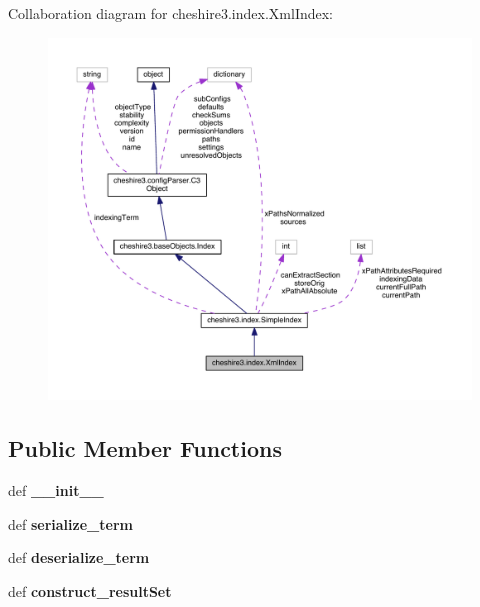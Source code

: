 Collaboration diagram for cheshire3.\-index.\-Xml\-Index\-:
\nopagebreak
\begin{figure}[H]
\begin{center}
\leavevmode
\includegraphics[width=350pt]{classcheshire3_1_1index_1_1_xml_index__coll__graph}
\end{center}
\end{figure}
\subsection*{Public Member Functions}
\begin{DoxyCompactItemize}
\item 
\hypertarget{classcheshire3_1_1index_1_1_xml_index_af459d3f084d67d7733295c9b218fe2a8}{def {\bfseries \-\_\-\-\_\-init\-\_\-\-\_\-}}\label{classcheshire3_1_1index_1_1_xml_index_af459d3f084d67d7733295c9b218fe2a8}

\item 
\hypertarget{classcheshire3_1_1index_1_1_xml_index_ab568891cd1e5bae3963b904f4f618d79}{def {\bfseries serialize\-\_\-term}}\label{classcheshire3_1_1index_1_1_xml_index_ab568891cd1e5bae3963b904f4f618d79}

\item 
\hypertarget{classcheshire3_1_1index_1_1_xml_index_ae3dba174bee2b34526ae210fe9f7364c}{def {\bfseries deserialize\-\_\-term}}\label{classcheshire3_1_1index_1_1_xml_index_ae3dba174bee2b34526ae210fe9f7364c}

\item 
\hypertarget{classcheshire3_1_1index_1_1_xml_index_ab3d734b9f839992b7ab99ef6a1a9e442}{def {\bfseries construct\-\_\-result\-Set}}\label{classcheshire3_1_1index_1_1_xml_index_ab3d734b9f839992b7ab99ef6a1a9e442}

\end{DoxyCompactItemize}
